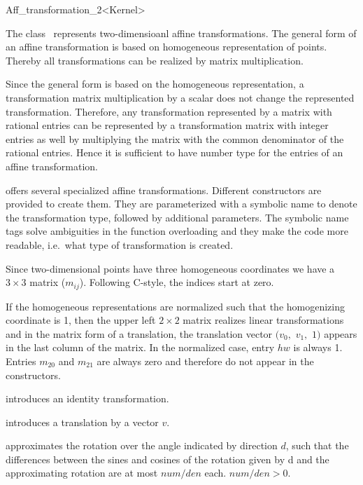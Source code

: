 \begin{ccRefClass}{Aff_transformation_2<Kernel>}

\ccDefinition
The class \ccRefName\ represents two-dimensioanl affine transformations. 
The general form of an affine transformation is based on homogeneous
representation of points. Thereby all transformations can be realized by
matrix multiplication. 

Since the general form is based on the homogeneous representation, a
transformation matrix multiplication by a scalar does not change
the represented transformation. Therefore, any transformation represented
by a matrix with rational entries can be represented by a 
transformation matrix with integer entries as well by multiplying
the matrix with the common denominator of the rational entries. 
Hence it is sufficient to have number type  for the entries 
of an affine transformation.

{\cgal} offers several specialized affine transformations. 
Different constructors are provided to create them. 
They are parameterized with a symbolic name to
denote the transformation type, followed by additional parameters.
The symbolic name tags solve ambiguities in the function
overloading and they make the code more readable, i.e.\ what type
of transformation is created.

Since two-dimensional points have three 
homogeneous coordinates we have a $3\times 3$ matrix ($m_{ij}$).
Following C-style, the indices start at zero.

If the homogeneous representations are normalized such that the 
homogenizing coordinate is 1, then the upper left $2\times 2$ matrix realizes
linear transformations and in the matrix form of a translation,  the
translation vector $(v_0,$ $v_1,$ $1)$ appears in the last column of the 
matrix. In the normalized case, entry $hw$ is always 1.
Entries $m_{20}$ and $m_{21}$ are always zero and therefore do not appear in
the constructors.


\ccCreation
{}

            {introduces an identity transformation.}

            {introduces a translation by a vector $v$.}

            {approximates the rotation over the angle indicated by direction 
             $d$, such that the differences between the sines and cosines
             of the rotation given by d and the approximating rotation
             are at most $num/den$ each.
             \ccPrecond $num/den>0$. }


\end{ccRefClass}
